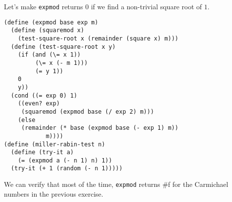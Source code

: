 \documentclass[a4paper,12pt]{article}
\begin{document}
Let's make \lstinline!expmod! returns $0$ if we find a non-trivial
square root of $1$.
\begin{lstlisting}
(define (expmod base exp m)
  (define (squaremod x)
    (test-square-root x (remainder (square x) m)))
  (define (test-square-root x y)
    (if (and (\= x 1))
	     (\= x (- m 1)))
	     (= y 1))
	0
	y))
  (cond ((= exp 0) 1)
	((even? exp)
	 (squaremod (expmod base (/ exp 2) m)))
	(else
	 (remainder (* base (expmod base (- exp 1) m))
		    m))))
(define (miller-rabin-test n)
  (define (try-it a)
    (= (expmod a (- n 1) n) 1))
  (try-it (+ 1 (random (- n 1)))))
\end{lstlisting}
We can verify that most of the time, \lstinline!expmod! returns \#f
for the Carmichael numbers in the previous exercise.
\end{document}
